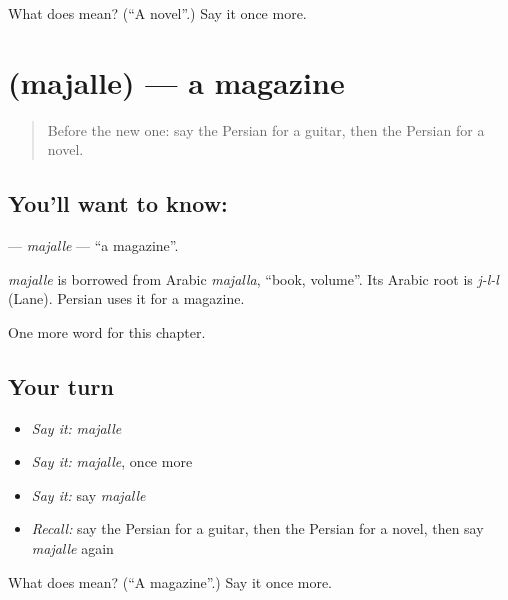\begin{tcolorbox}[breakable,colback=teal!4,colframe=teal!35!black,title={Before you move on}]
What does  mean? (\textquotedblleft{}A novel\textquotedblright{}.) Say it once more.
\end{tcolorbox}
\section[\texorpdfstring{\fa{مجله} (majalle)}{مجله (majalle)}]{ (majalle) — a magazine}

\label{lesson:FA-C172-majalle}



\begin{quote}
Before the new one: say the Persian for a guitar, then the Persian for a novel.
\end{quote}

\subsection*{You'll want to know: }
\textbf{} — \emph{majalle} — \textquotedblleft{}a magazine\textquotedblright{}.

\begin{cousinweb}
\emph{majalle} is borrowed from Arabic \emph{majalla}, \textquotedblleft{}book, volume\textquotedblright{}. Its Arabic root is \emph{j-l-l} (Lane). Persian uses it for a magazine.
\end{cousinweb}

\begin{grammarlens}[title={What you've built}]
One more word for this chapter.
\end{grammarlens}

\subsection*{Your turn}
\begin{itemize}
\raggedright
  \item \emph{Say it:} \emph{majalle}
  \item \emph{Say it:} \emph{majalle}, once more
  \item \emph{Say it:} say \emph{majalle}
  \item \emph{Recall:} say the Persian for a guitar, then the Persian for a novel, then say \emph{majalle} again
\end{itemize}

\begin{tcolorbox}[breakable,colback=teal!4,colframe=teal!35!black,title={Before you move on}]
What does  mean? (\textquotedblleft{}A magazine\textquotedblright{}.) Say it once more.
\end{tcolorbox}
